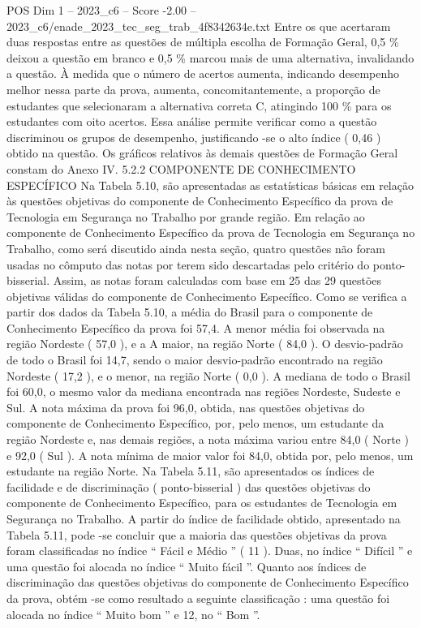 \begin{textsample}{POS Dim 1 – 2023\_c6 – Score -2.00 – 2023\_c6/enade\_2023\_tec\_seg\_trab\_4f8342634e.txt}
Entre os que acertaram duas respostas entre as questões de múltipla escolha de Formação Geral, 0,5 \% deixou a questão em branco e 0,5 \% marcou mais de uma alternativa, invalidando a questão.
À medida que o número de acertos aumenta, indicando desempenho melhor nessa parte da prova, aumenta, concomitantemente, a proporção de estudantes que selecionaram a alternativa correta C, atingindo 100 \% para os estudantes com oito acertos.
Essa análise permite verificar como a questão discriminou os grupos de desempenho, justificando -se o alto índice ( 0,46 ) obtido na questão.
Os gráficos relativos às demais questões de Formação Geral constam do Anexo IV. 5.2.2 COMPONENTE DE CONHECIMENTO ESPECÍFICO Na Tabela 5.10, são apresentadas as estatísticas básicas em relação às questões objetivas do componente de Conhecimento Específico da prova de Tecnologia em Segurança no Trabalho por grande região.
Em relação ao componente de Conhecimento Específico da prova de Tecnologia em Segurança no Trabalho, como será discutido ainda nesta seção, quatro questões não foram usadas no cômputo das notas por terem sido descartadas pelo critério do ponto-bisserial.
Assim, as notas foram calculadas com base em 25 das 29 questões objetivas válidas do componente de Conhecimento Específico.
Como se verifica a partir dos dados da Tabela 5.10, a média do Brasil para o componente de Conhecimento Específico da prova foi 57,4.
A menor média foi observada na região Nordeste ( 57,0 ), e a A maior, na região Norte ( 84,0 ).
O desvio-padrão de todo o Brasil foi 14,7, sendo o maior desvio-padrão encontrado na região Nordeste ( 17,2 ), e o menor, na região Norte ( 0,0 ).
A mediana de todo o Brasil foi 60,0, o mesmo valor da mediana encontrada nas regiões Nordeste, Sudeste e Sul.
A nota máxima da prova foi 96,0, obtida, nas questões objetivas do componente de Conhecimento Específico, por, pelo menos, um estudante da região Nordeste e, nas demais regiões, a nota máxima variou entre 84,0 ( Norte ) e 92,0 ( Sul ).
A nota mínima de maior valor foi 84,0, obtida por, pelo menos, um estudante na região Norte.
Na Tabela 5.11, são apresentados os índices de facilidade e de discriminação ( ponto-bisserial ) das questões objetivas do componente de Conhecimento Específico, para os estudantes de Tecnologia em Segurança no Trabalho.
A partir do índice de facilidade obtido, apresentado na Tabela 5.11, pode -se concluir que a maioria das questões objetivas da prova foram classificadas no índice “ Fácil e Médio ” ( 11 ).
Duas, no índice “ Difícil ” e uma questão foi alocada no índice “ Muito fácil ”.
Quanto aos índices de discriminação das questões objetivas do componente de Conhecimento Específico da prova, obtém -se como resultado a seguinte classificação : uma questão foi alocada no índice “ Muito bom ” e 12, no “ Bom ”.

\end{textsample}
